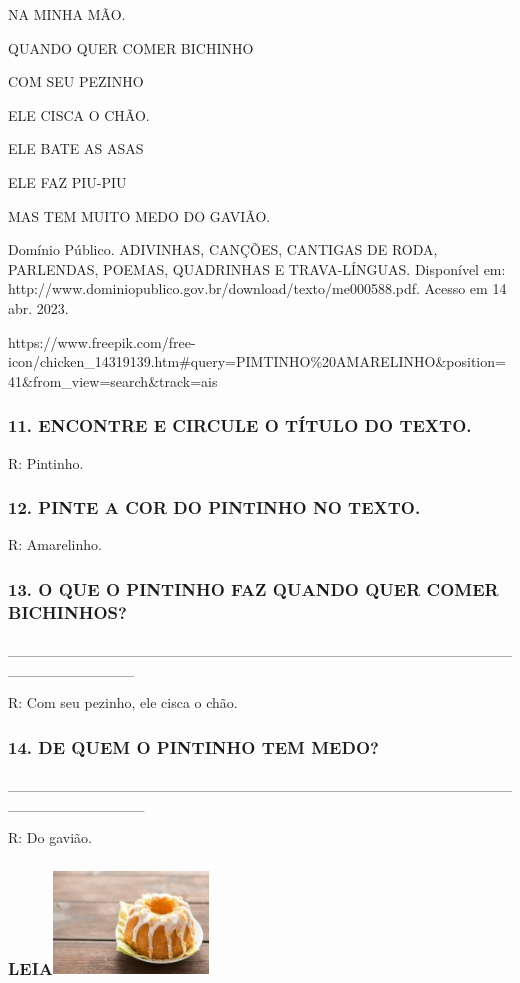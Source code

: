 NA MINHA MÃO.

QUANDO QUER COMER BICHINHO

\protect\hypertarget{_heading=h.2jxsxqh}{}{}COM SEU PEZINHO

ELE CISCA O CHÃO.

ELE BATE AS ASAS

ELE FAZ PIU-PIU

MAS TEM MUITO MEDO DO GAVIÃO.

Domínio Público. ADIVINHAS, CANÇÕES, CANTIGAS DE RODA, PARLENDAS, POEMAS, QUADRINHAS E TRAVA-LÍNGUAS. Disponível em: http://www.dominiopublico.gov.br/download/texto/me000588.pdf. Acesso em 14 abr. 2023.

https://www.freepik.com/free-icon/chicken\_14319139.htm\#query=PIMTINHO\%20AMARELINHO\&position=41\&from\_view=search\&track=ais

\subsubsection{11. ENCONTRE E CIRCULE O TÍTULO DO
TEXTO.}\label{encontre-e-circule-o-tuxedtulo-do-texto.}
R: Pintinho.

\subsubsection{12. PINTE A COR DO PINTINHO NO
TEXTO.}\label{pinte-a-cor-do-pintinho-no-texto.}
R: Amarelinho.

\subsubsection{13. O QUE O PINTINHO FAZ QUANDO QUER COMER
BICHINHOS?}\label{o-que-o-pintinho-faz-quando-quer-comer-bichinhos}

\_\_\_\_\_\_\_\_\_\_\_\_\_\_\_\_\_\_\_\_\_\_\_\_\_\_\_\_\_\_\_\_\_\_\_\_\_\_\_\_\_\_\_\_\_\_\_\_\_\_\_\_\_\_\_\_\_\_\_\_

R: Com seu pezinho, ele cisca o chão.

\subsubsection{14. DE QUEM O PINTINHO TEM
MEDO?}\label{de-quem-o-pintinho-tem-medo}

\_\_\_\_\_\_\_\_\_\_\_\_\_\_\_\_\_\_\_\_\_\_\_\_\_\_\_\_\_\_\_\_\_\_\_\_\_\_\_\_\_\_\_\_\_\_\_\_\_\_\_\_\_\_\_\_\_\_\_\_\_

R: Do gavião.

\subsubsection[LEIA]{\texorpdfstring{LEIA\protect\includegraphics[width=1.61944in,height=1.07917in]{media/image130.jpg}}{LEIA}}\label{leia-1}

